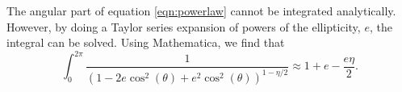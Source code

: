 The angular part of equation \ref{eqn:powerlaw} cannot be integrated analytically. However, by doing a Taylor series expansion of powers of the ellipticity, $e$, the integral can be solved. Using Mathematica, we find that 
\begin{equation}
\int_0^{2 \pi} \frac{1}{ (1 - 2 e \cos^2(\theta) + e^2\cos^2(\theta))^{1 - \eta / 2}} \approx 1 + e  - \frac{ e \eta}{2}.
\end{equation}